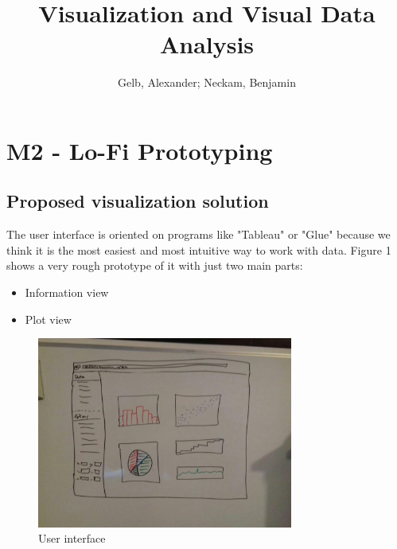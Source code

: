 \documentclass{article}
\begin{document}
\title{Visualization and Visual Data Analysis}
\author{Gelb, Alexander; Neckam, Benjamin}
\maketitle
\section{M2 - Lo-Fi Prototyping}
\subsection{Proposed visualization solution}
The user interface is oriented on programs like "Tableau" or "Glue" because we think it is the most easiest and most intuitive way to work with data. Figure 1 shows a very rough prototype of it with just two main parts:\\
\begin{itemize}
\item Information view
\item Plot view
\end{itemize}

\begin{figure}[!h]
\centering
    \includegraphics[width=0.75\textwidth]{Prototype1.jpg}
	\caption{User interface}
	\label{fig1}
\end{figure}
\end{document}
